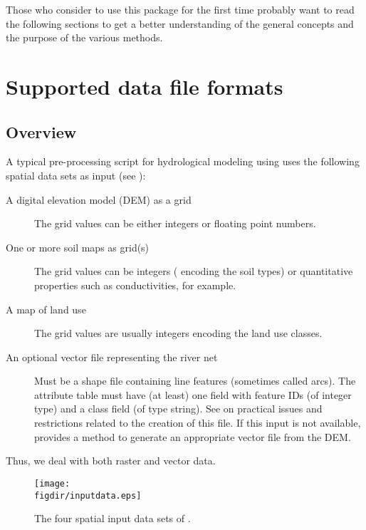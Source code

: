 Those who consider to use this package for the first time probably want to read the following sections to get a better understanding of the general concepts and the purpose of the various methods.


\section{Supported data file formats} \label{sec:topocatch:formats}

\subsection{Overview} \label{sec:topocatch:formats-overview}

A typical pre-processing script for hydrological modeling using  uses the following spatial data sets as input (see ):

\begin{description}
  \item [A digital elevation model (DEM) as a grid] The grid values can be either integers or floating point numbers.
  \item [One or more soil maps as grid(s)] The grid values can be integers (\eg{} encoding the soil types) or quantitative properties such as conductivities, for example.
  \item [A map of land use] The grid values are usually integers encoding the land use classes.
  \item [An optional vector file representing the river net] Must be a shape file containing line features (sometimes called arcs). The attribute table must have (at least) one field with feature IDs (of integer type) and a class field (of type string). See  on practical issues and restrictions related to the creation of this file. If this input is not available,  provides a method to generate an appropriate vector file from the DEM.
\end{description}

Thus, we deal with both raster and vector data.

\begin{figure}
  \centering
  \texttt{[image: \\figdir/inputdata.eps]}
  \caption{The four spatial input data sets of . \label{fig:topocatch-inputdata}}
\end{figure}

